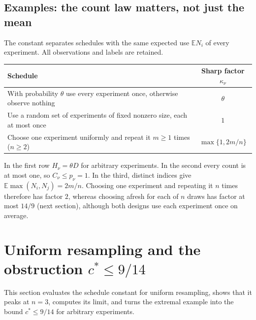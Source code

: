 \documentclass[11pt,a4paper]{article}
\theoremstyle{definition}\newtheorem{definition}[theorem]{Definition}
\theoremstyle{remark}\newtheorem{remark}[theorem]{Remark}
\newcommand{\E}{\mathbb E}
\begin{document}
\subsection{Examples: the count law matters, not just the mean}
The constant separates schedules with the same expected use $\E N_i$ of every experiment. All observations and labels are retained.
\begin{center}
\begin{tabular}{p{}c}
\toprule
Schedule & Sharp factor $\kappa_\nu$\\
\midrule
With probability $\theta$ use every experiment once, otherwise observe nothing & $\theta$\\[3pt]
Use a random set of experiments of fixed nonzero size, each at most once & $1$\\[3pt]
Choose one experiment uniformly and repeat it $m\ge1$ times ($n\ge2$) & $\max\{1,2m/n\}$\\
\bottomrule
\end{tabular}
\end{center}
In the first row $H_\nu=\theta D$ for arbitrary experiments. In the second every count is at most one, so $C_\nu\le p_\nu=1$. In the third, distinct indices give $\E\max(N_i,N_j)=2m/n$. Choosing one experiment and repeating it $n$ times therefore has factor $2$, whereas choosing afresh for each of $n$ draws has factor at most $14/9$ (next section), although both designs use each experiment once on average.

\section{Uniform resampling and the obstruction \texorpdfstring{$c^*\le 9/14$}{c* <= 9/14}}\label{sec:uniform}
This section evaluates the schedule constant for uniform resampling, shows that it peaks at $n=3$, computes its limit, and turns the extremal example into the bound $c^*\le9/14$ for arbitrary experiments.
\end{document}
